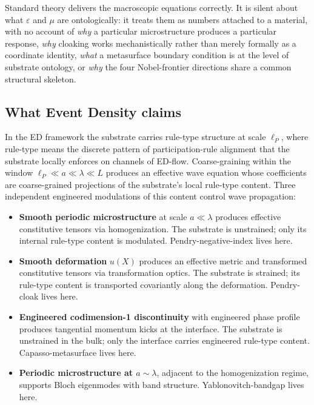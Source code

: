 \documentclass[11pt,a4paper]{article}
\begin{document}
Standard theory delivers the macroscopic equations correctly. It is silent about what $\varepsilon$ and $\mu$ are ontologically: it treats them as numbers attached to a material, with no account of \emph{why} a particular microstructure produces a particular response, \emph{why} cloaking works mechanistically rather than merely formally as a coordinate identity, \emph{what} a metasurface boundary condition is at the level of substrate ontology, or \emph{why} the four Nobel-frontier directions share a common structural skeleton.

\subsection{What Event Density claims}

In the ED framework the substrate carries rule-type structure at scale $\ell_P$, where rule-type means the discrete pattern of participation-rule alignment that the substrate locally enforces on channels of ED-flow. Coarse-graining within the window $\ell_P \ll a \ll \lambda \ll L$ produces an effective wave equation whose coefficients are coarse-grained projections of the substrate's local rule-type content. Three independent engineered modulations of this content control wave propagation:

\begin{itemize}[noitemsep]
\item \textbf{Smooth periodic microstructure} at scale $a \ll \lambda$ produces effective constitutive tensors via homogenization. The substrate is unstrained; only its internal rule-type content is modulated. Pendry-negative-index lives here.
\item \textbf{Smooth deformation} $u(X)$ produces an effective metric and transformed constitutive tensors via transformation optics. The substrate is strained; its rule-type content is transported covariantly along the deformation. Pendry-cloak lives here.
\item \textbf{Engineered codimension-1 discontinuity} with engineered phase profile produces tangential momentum kicks at the interface. The substrate is unstrained in the bulk; only the interface carries engineered rule-type content. Capasso-metasurface lives here.
\item \textbf{Periodic microstructure at $a \sim \lambda$}, adjacent to the homogenization regime, supports Bloch eigenmodes with band structure. Yablonovitch-bandgap lives here.
\end{itemize}
\end{document}
